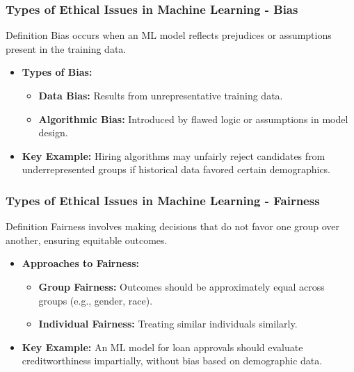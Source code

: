 \documentclass[aspectratio=169]{beamer}
\begin{document}
\begin{frame}[fragile]
    \frametitle{Types of Ethical Issues in Machine Learning - Bias}
    \begin{block}{Definition}
        Bias occurs when an ML model reflects prejudices or assumptions present in the training data.
    \end{block}
    
    \begin{itemize}
        \item \textbf{Types of Bias:}
        \begin{itemize}
            \item \textbf{Data Bias:} Results from unrepresentative training data.
            \item \textbf{Algorithmic Bias:} Introduced by flawed logic or assumptions in model design.
        \end{itemize}
        \item \textbf{Key Example:} Hiring algorithms may unfairly reject candidates from underrepresented groups if historical data favored certain demographics.
    \end{itemize}
\end{frame}

\begin{frame}[fragile]
    \frametitle{Types of Ethical Issues in Machine Learning - Fairness}
    \begin{block}{Definition}
        Fairness involves making decisions that do not favor one group over another, ensuring equitable outcomes.
    \end{block}
    
    \begin{itemize}
        \item \textbf{Approaches to Fairness:}
        \begin{itemize}
            \item \textbf{Group Fairness:} Outcomes should be approximately equal across groups (e.g., gender, race).
            \item \textbf{Individual Fairness:} Treating similar individuals similarly.
        \end{itemize}
        \item \textbf{Key Example:} An ML model for loan approvals should evaluate creditworthiness impartially, without bias based on demographic data.
    \end{itemize}
\end{frame}
\end{document}
